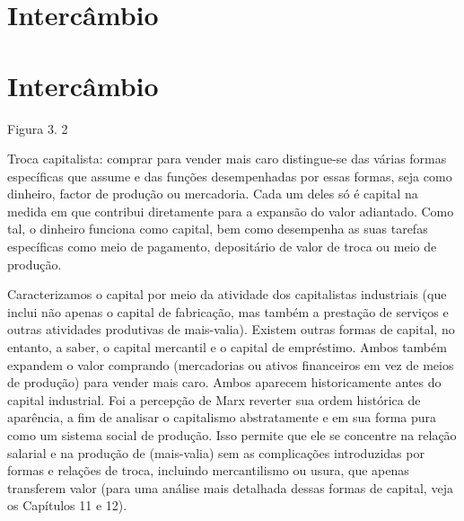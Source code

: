 \section{Intercâmbio}
 \par 
\section{Intercâmbio}
 \par 
Figura {\color{blue}3}. {\color{blue} 2 } {\par} Troca capitalista: comprar para vender mais caro distingue-se das várias formas específicas que assume e das funções desempenhadas por essas formas, seja como dinheiro, factor de produção ou mercadoria. Cada um deles só é capital na medida em que contribui diretamente para a expansão do valor adiantado. Como tal, o dinheiro funciona como capital, bem como desempenha as suas tarefas específicas como meio de pagamento, depositário de valor de troca ou meio de produção.
 \par 
Caracterizamos o capital por meio da atividade dos capitalistas industriais (que inclui não apenas o capital de fabricação, mas também a prestação de serviços e outras atividades produtivas de mais-valia). Existem outras formas de capital, no entanto, a saber, o capital mercantil e o capital de empréstimo. Ambos também expandem o valor comprando (mercadorias ou ativos financeiros em vez de meios de produção) para vender mais caro. Ambos aparecem historicamente antes do capital industrial. Foi a percepção de Marx reverter sua ordem histórica de aparência, a fim de analisar o capitalismo abstratamente e em sua forma pura como um sistema social de produção. Isso permite que ele se concentre na relação salarial e na produção de (mais-valia) sem as complicações introduzidas por formas e relações de troca, incluindo mercantilismo ou usura, que apenas transferem valor (para uma análise mais detalhada dessas formas de capital, veja os Capítulos {\color{blue}11} e {\color{blue}12}).
 \par 

